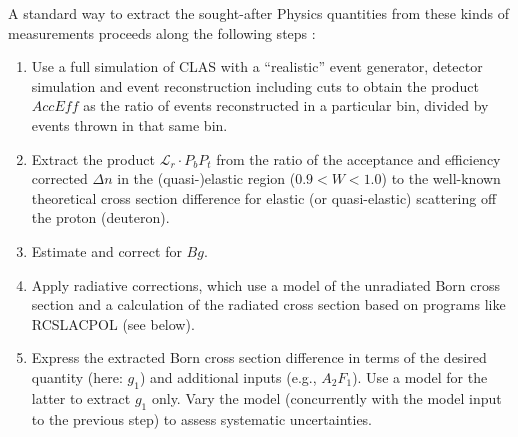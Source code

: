A standard way to extract the sought-after Physics quantities from these kinds of measurements proceeds along the following steps \cite{KuhnEG4ana}:
\begin{enumerate}
\item Use a full simulation of CLAS with a ``realistic'' event generator, detector simulation and event reconstruction 
including cuts to obtain the product $Acc Eff$ as the ratio of events  reconstructed  in a particular bin, divided by events thrown in that same bin.
\item Extract the product ${\mathcal L}_r  \cdot P_b P_t$ from the ratio of the acceptance and efficiency corrected $\Delta n$ in the (quasi-)elastic region ($0.9 < W < 1.0$) to the well-known theoretical cross section difference for elastic (or quasi-elastic) scattering off the proton (deuteron).
\item Estimate and correct for $Bg$.
\item Apply radiative corrections, which use a model of the unradiated Born cross section and a calculation of the radiated cross section based on programs like RCSLACPOL (see below). %
\item Express the extracted Born cross section difference in terms of the desired quantity (here: $g_1$) and 
additional inputs (e.g., $A_2F_1$). Use a model for the latter to extract $g_1$ only. Vary the model (concurrently with
the model input to the previous step) to assess systematic uncertainties.
\end{enumerate}

